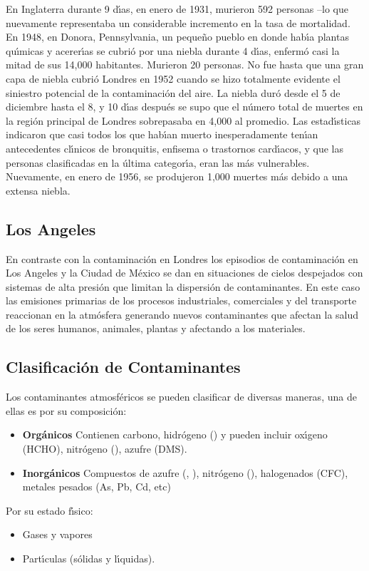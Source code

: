 En Inglaterra durante 9 d\'{\i}as, en enero de 1931, murieron 592 personas --lo que nuevamente representaba un considerable incremento en la tasa de mortalidad. En 1948, en Donora, Pennsylvania, un peque\~no pueblo en donde hab\'{\i}a plantas qu\'{\i}micas y acerer\'{\i}as se cubri\'o por una niebla durante 4 d\'{\i}as,  enferm\'o casi la mitad de sus 14,000 habitantes. Murieron 20 personas. No fue hasta que una gran capa de niebla cubri\'o Londres en 1952 cuando se hizo totalmente evidente el siniestro potencial de la contaminaci\'on del aire. La niebla dur\'o desde el 5 de diciembre hasta el 8, y 10 d\'{\i}as despu\'es se supo que el n\'umero total de muertes en la regi\'on principal de Londres sobrepasaba en 4,000 al promedio. Las estad\'{\i}sticas indicaron que casi todos los que hab\'{\i}an muerto inesperadamente ten\'{\i}an antecedentes cl\'{\i}nicos de bronquitis, enfisema o trastornos card\'{\i}acos, y que las personas clasificadas en la \'ultima categor\'{\i}a, eran las m\'as vulnerables. Nuevamente, en enero de 1956, se produjeron 1,000 muertes m\'as debido a una extensa niebla.

 
 \subsection{Los Angeles}
En contraste con la contaminaci\'on en Londres los episodios de contaminaci\'on en Los Angeles y la Ciudad de M\'exico se dan en situaciones de cielos despejados con sistemas de alta presi\'on que limitan la dispersi\'on de contaminantes. En este caso las emisiones primarias de los procesos industriales, comerciales y del transporte reaccionan en la atm\'osfera generando nuevos contaminantes que afectan la salud de los seres humanos, animales, plantas  y afectando a los materiales.

\subsection{Clasificaci\'on de Contaminantes}

Los contaminantes atmosf\'ericos se pueden clasificar de diversas maneras, una de ellas es por su composici\'on:

\begin{itemize}
\item \textbf{Org\'anicos} Contienen carbono, hidr\'ogeno () y pueden incluir ox\'{\i}geno (HCHO), nitr\'ogeno (), azufre (DMS).
\item \textbf{Inorg\'anicos} Compuestos de azufre (, ), nitr\'ogeno (), halogenados (CFC), metales pesados (As, Pb, Cd, etc)
\end{itemize}
Por su estado f\'{\i}sico:
\begin{itemize}
\item Gases y vapores
\item Part\'{\i}culas (s\'olidas y l\'{\i}quidas).
\end{itemize}

